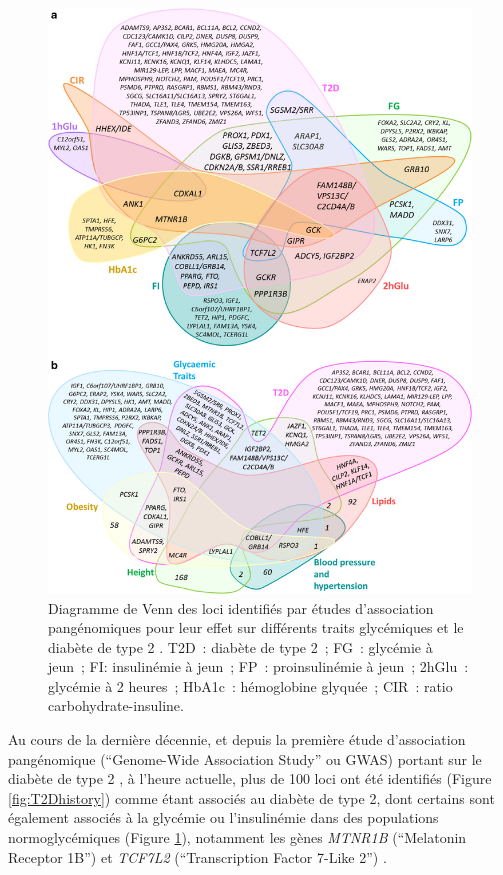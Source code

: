 \documentclass[11pt,a4paper,notrimn]{krantz}
\theoremstyle{definition}
\theoremstyle{definition}
\theoremstyle{remark}
\begin{document}
\begin{figure}[!htb]

{\centering \includegraphics[width=6in]{FiguresTables/ProkopenkoMetaboDiagram} 

}

\caption{Diagramme de Venn des loci identifiés par
études d'association pangénomiques pour leur effet sur différents traits
glycémiques et le diabète de type 2 \citep{marullo_insights_2014}. T2D~:
diabète de type 2~; FG~: glycémie à jeun~; FI: insulinémie à jeun~; FP~:
proinsulinémie à jeun~; 2hGlu~: glycémie à 2 heures~; HbA1c~:
hémoglobine glyquée~; CIR~: ratio carbohydrate-insuline.}\label{fig:ProkopenkoMetaboDiagram}
\end{figure}

Au cours de la dernière décennie, et depuis la première étude
d'association pangénomique (``Genome-Wide Association Study'' ou GWAS)
portant sur le diabète de type 2 \citep{sladek_genome-wide_2007}, à
l'heure actuelle, plus de 100 loci ont été identifiés (Figure
\ref{fig:T2Dhistory}) comme étant associés au diabète de type 2, dont
certains sont également associés à la glycémie ou l'insulinémie dans des
populations normoglycémiques (Figure \ref{fig:ProkopenkoMetaboDiagram}),
notamment les gènes \emph{MTNR1B} (``Melatonin Receptor 1B'')
\citep{bouatia-naji_variant_2009, prokopenko_variants_2009, sladek_genome-wide_2007, tam_common_2010}
et \emph{TCF7L2} (``Transcription Factor 7-Like 2'')
\citep{grant_variant_2006, groves_association_2006, zhang_variant_2006}.
\end{document}
